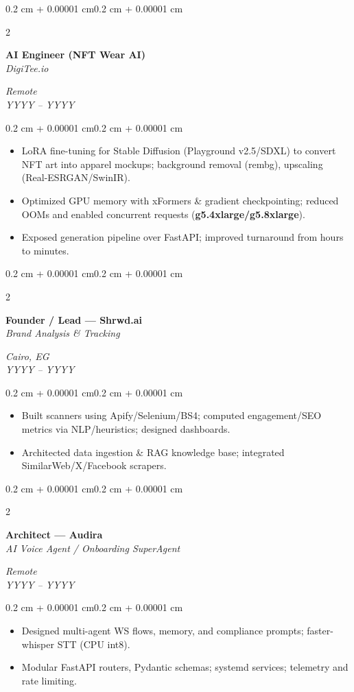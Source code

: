 \documentclass[10pt, letterpaper]{article}
\newenvironment{highlights}{
  \begin{itemize}[
    topsep=0.10 cm,
    parsep=0.10 cm,
    partopsep=0pt,
    itemsep=0pt,
    leftmargin=0.4 cm + 10pt
  ]}
  {\end{itemize}
}
\newenvironment{onecolentry}{
  \begin{adjustwidth}{0.2 cm + 0.00001 cm}{0.2 cm + 0.00001 cm}
}{
  \end{adjustwidth}
}
\newenvironment{twocolentry}[2][]{
  \onecolentry
  \def\secondColumn{#2}
  \setcolumnwidth{\fill, 4.5 cm}
  \begin{paracol}{2}
}{
  \switchcolumn \raggedleft \secondColumn
  \end{paracol}
  \endonecolentry
}
\begin{document}
\begin{twocolentry}{
  \textit{Remote} \\
  \textit{YYYY -- YYYY}}
  \textbf{AI Engineer (NFT Wear AI)} \\
  \textit{DigiTee.io}
\end{twocolentry}
\vspace{0.10 cm}
\begin{onecolentry}
  \begin{highlights}
    \item {LoRA fine-tuning for Stable Diffusion (Playground v2.5/SDXL) to convert NFT art into apparel mockups; background removal (rembg), upscaling (Real-ESRGAN/SwinIR).}
    \item {Optimized GPU memory with xFormers \& gradient checkpointing; reduced OOMs and enabled concurrent requests (\textbf{g5.4xlarge/g5.8xlarge}).}
    \item {Exposed generation pipeline over FastAPI; improved turnaround from hours to minutes.}
  \end{highlights}
\end{onecolentry}

\begin{twocolentry}{
  \textit{Cairo, EG} \\
  \textit{YYYY -- YYYY}}
  \textbf{Founder / Lead — Shrwd.ai} \\
  \textit{Brand Analysis \& Tracking}
\end{twocolentry}
\vspace{0.10 cm}
\begin{onecolentry}
  \begin{highlights}
    \item {Built scanners using Apify/Selenium/BS4; computed engagement/SEO metrics via NLP/heuristics; designed dashboards.}
    \item {Architected data ingestion \& RAG knowledge base; integrated SimilarWeb/X/Facebook scrapers.}
  \end{highlights}
\end{onecolentry}

\begin{twocolentry}{
  \textit{Remote} \\
  \textit{YYYY -- YYYY}}
  \textbf{Architect — Audira} \\
  \textit{AI Voice Agent / Onboarding SuperAgent}
\end{twocolentry}
\vspace{0.10 cm}
\begin{onecolentry}
  \begin{highlights}
    \item {Designed multi-agent WS flows, memory, and compliance prompts; faster-whisper STT (CPU int8).}
    \item {Modular FastAPI routers, Pydantic schemas; systemd services; telemetry and rate limiting.}
  \end{highlights}
\end{onecolentry}
\end{document}
